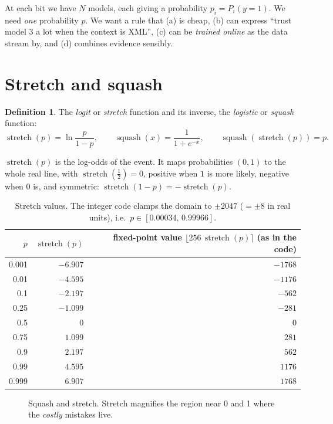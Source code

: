 \documentclass[11pt,a4paper,openany]{book}
\newcommand{\st}{\operatorname{stretch}}
\newcommand{\sq}{\operatorname{squash}}
\theoremstyle{definition}
\newtheorem{definition}{Definition}[chapter]
\theoremstyle{remark}
\begin{document}
At each bit we have $N$ models, each giving a probability $p_i=P_i(y=1)$. We need \emph{one} probability $p$. We want a rule that (a) is cheap, (b) can express ``trust model 3 a lot when the context is XML'', (c) can be \emph{trained online} as the data stream by, and (d) combines evidence sensibly.

\section{Stretch and squash}

\begin{definition}
The \emph{logit} or \emph{stretch} function and its inverse, the \emph{logistic} or \emph{squash} function:
\[
\st(p)=\ln\frac{p}{1-p},\qquad \sq(x)=\frac1{1+e^{-x}},\qquad \sq(\st(p))=p.
\]
\end{definition}
$\st(p)$ is the log-odds of the event. It maps probabilities $(0,1)$ to the whole real line, with $\st(\tfrac12)=0$, positive when $1$ is more likely, negative when $0$ is, and symmetric: $\st(1-p)=-\st(p)$.

\begin{table}[h]
\centering
\begin{tabular}{@{}rrr@{}}
\toprule
$p$ & $\st(p)$ & fixed-point value $\lfloor 256\,\st(p)\rceil$ (as in the code)\\
\midrule
0.001 & $-6.907$ & $-1768$\\
0.01 & $-4.595$ & $-1176$\\
0.1 & $-2.197$ & $-562$\\
0.25 & $-1.099$ & $-281$\\
0.5 & $0$ & $0$\\
0.75 & $1.099$ & $281$\\
0.9 & $2.197$ & $562$\\
0.99 & $4.595$ & $1176$\\
0.999 & $6.907$ & $1768$\\
\bottomrule
\end{tabular}
\caption{Stretch values. The integer code clamps the domain to $\pm2047$ ($=\pm8$ in real units), i.e.\ $p\in[0.00034,\,0.99966]$.}
\end{table}

\begin{figure}[h]
\centering
{}\hfill
{}
\caption{Squash and stretch. Stretch magnifies the region near 0 and 1 where the \emph{costly} mistakes live.}
\end{figure}
\end{document}
